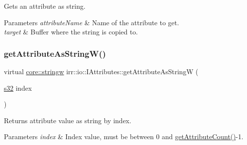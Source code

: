 Gets an attribute as string. 


\begin{DoxyParams}{Parameters}
{\em attribute\+Name} & Name of the attribute to get. \\
\hline
{\em target} & Buffer where the string is copied to. \\
\hline
\end{DoxyParams}
\mbox{\label{classirr_1_1io_1_1IAttributes_a60ab65d3d3e123af2b2d47b1bd48f771}} 
\subsubsection{\texorpdfstring{get\+Attribute\+As\+String\+W()}{getAttributeAsStringW()}\hspace{0.1cm}{\footnotesize\ttfamily [3/3]}}
{\footnotesize\ttfamily virtual \hyperlink{namespaceirr_1_1core_aef83fafbb1b36fcce44c07c9be23a7f2}{core\+::stringw} irr\+::io\+::\+I\+Attributes\+::get\+Attribute\+As\+StringW (\begin{DoxyParamCaption}\item[{\hyperlink{namespaceirr_ac66849b7a6ed16e30ebede579f9b47c6}{s32}}]{index }\end{DoxyParamCaption})\hspace{0.3cm}{\ttfamily [pure virtual]}}



Returns attribute value as string by index. 


\begin{DoxyParams}{Parameters}
{\em index} & Index value, must be between 0 and \hyperlink{classirr_1_1io_1_1IAttributes_a796bdd9440ee7ba0b6742a90a82870b6}{get\+Attribute\+Count()}-\/1. \\
\hline
\end{DoxyParams}
\mbox{\label{classirr_1_1io_1_1IAttributes_a2044beb7dcf310beb95ed0f4008f2b27}} 
